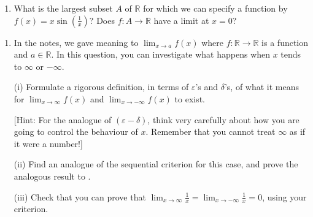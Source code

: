 \documentclass[letterpaper,10pt,english]{jupyterBook}
\begin{document}
\label{\detokenize{Problems:id10}}\begin{enumerate}
%
\setcounter{enumi}{9}
\item {} 
\sphinxAtStartPar
What is the largest subset \(A\) of \(\mathbb{R}\) for which we can specify a function by \(f(x) = x\sin\left(\frac{1}{x}\right)\)? Does \(f:A\to\mathbb{R}\)  have a limit at \(x = 0\)?

\end{enumerate}
\label{\detokenize{Problems:id11}}\begin{enumerate}
%
\setcounter{enumi}{10}
\item {} 
\sphinxAtStartPar
In the notes, we gave meaning to \(\displaystyle\lim_{x \rightarrow a} f(x)\) where \(f:\mathbb{R} \rightarrow \mathbb{R}\) is a function and \(a \in \mathbb{R}\). In this question, you can investigate what happens when \(x\) tends to \(\infty\) or \(-\infty\).

\sphinxAtStartPar
(i) Formulate a rigorous definition, in terms of \(\varepsilon\)’s and \(\delta\)’s, of what it means for \(\displaystyle\lim_{x \rightarrow \infty}f(x)\) and \(\displaystyle\lim_{x \rightarrow -\infty}f(x)\) to exist.

{[}Hint: For the analogue of \((\varepsilon-\delta)\), think very carefully about how you are going to control the behaviour of \(x\). Remember that you cannot treat \(\infty\) as if it were a number!{]}

\sphinxAtStartPar
(ii) Find an analogue of the sequential criterion for this case, and prove the analogous result to .

\sphinxAtStartPar
(iii) Check that you can prove that \(\displaystyle\lim_{x \rightarrow \infty}\frac{1}{x} = \lim_{x \rightarrow -\infty}\frac{1}{x} = 0\), using your criterion.

\end{enumerate}
\end{document}
